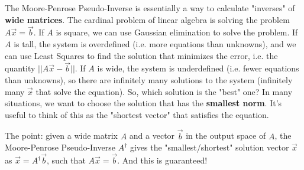 

The Moore-Penrose Pseudo-Inverse is essentially a way to calculate "inverses" of \textbf{wide matrices}. The cardinal problem of linear algebra is solving the problem $A\vec{x} = \vec{b}$. If $A$ is square, we can use Gaussian elimination to solve the problem. If $A$ is tall, the system is overdefined (i.e. more equations than unknowns), and we can use Least Squares to find the solution that minimizes the error, i.e. the quantity $||A\vec{x} - \vec{b}||$. If $A$ is wide, the system is underdefined (i.e. fewer equations than unknowns), so there are infinitely many solutions to the system (infinitely many $\vec{x}$ that solve the equation). So, which solution is the "best" one? In many situations, we want to choose the solution that has the \textbf{smallest norm}. It's useful to think of this as the "shortest vector" that satisfies the equation.

The point: given a wide matrix $A$ and a vector $\vec{b}$ in the output space of $A$, the Moore-Penrose Pseudo-Inverse $A^\dagger$ gives the "smallest/shortest" solution vector $\vec{x}$ as $\vec{x} = A^\dagger \vec{b}$, such that $A\vec{x} = \vec{b}$. And this is guaranteed!

